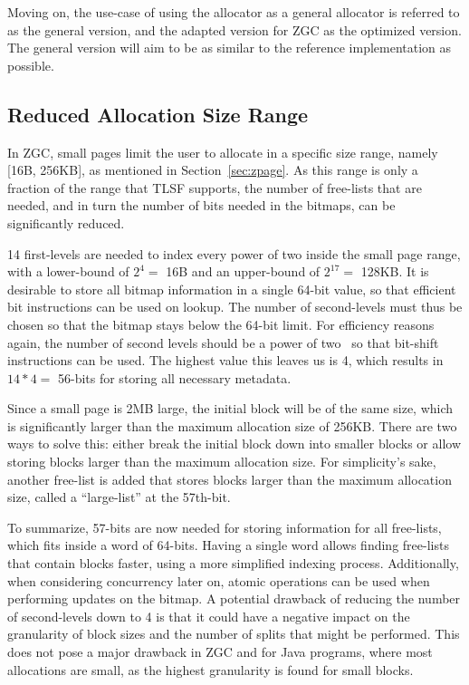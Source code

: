 Moving on, the use-case of using the allocator as a general allocator is referred to as the general version, and the adapted version for ZGC as the optimized version. The general version will aim to be as similar to the reference implementation as possible.

\subsection{Reduced Allocation Size Range}
\label{sec:adaptations:reduced_allocation_range}

In ZGC, small pages limit the user to allocate in a specific size range, namely [16B, 256KB], as mentioned in Section~\ref{sec:zpage}. As this range is only a fraction of the range that TLSF supports, the number of free-lists that are needed, and in turn the number of bits needed in the bitmaps, can be significantly reduced.

14 first-levels are needed to index every power of two inside the small page range, with a lower-bound of $2^4 =$ 16B and an upper-bound of $2^{17} =$ 128KB. It is desirable to store all bitmap information in a single 64-bit value, so that efficient bit instructions can be used on lookup. The number of second-levels must thus be chosen so that the bitmap stays below the 64-bit limit. For efficiency reasons again, the number of second levels should be a power of two~\cite{TLSF} so that bit-shift instructions can be used. The highest value this leaves us is 4, which results in $14 * 4 =$ 56-bits for storing all necessary metadata.

Since a small page is 2MB large, the initial block will be of the same size, which is significantly larger than the maximum allocation size of 256KB. There are two ways to solve this: either break the initial block down into smaller blocks or allow storing blocks larger than the maximum allocation size. For simplicity's sake, another free-list is added that stores blocks larger than the maximum allocation size, called a ``large-list'' at the 57th-bit.

To summarize, 57-bits are now needed for storing information for all free-lists, which fits inside a word of 64-bits. Having a single word allows finding free-lists that contain blocks faster, using a more simplified indexing process. Additionally, when considering concurrency later on, atomic operations can be used when performing updates on the bitmap. A potential drawback of reducing the number of second-levels down to 4 is that it could have a negative impact on the granularity of block sizes and the number of splits that might be performed. This does not pose a major drawback in ZGC and for Java programs, where most allocations are small, as the highest granularity is found for small blocks.

